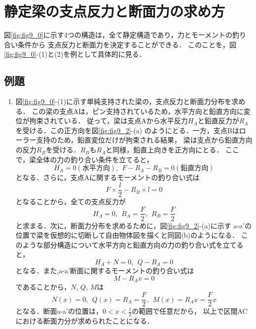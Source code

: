 \documentclass[10pt,a4j]{jbook}
\begin{document}
\section{静定梁の支点反力と断面力の求め方}
図\ref{fig:fig9_0}に示す4つの構造は，全て静定構造であり，力とモーメントの釣り合い条件から
支点反力と断面力を決定することができる．
このことを，図\ref{fig:fig9_0}-(1)と(2)を例として具体的に見る．
\subsection{例題}
\begin{enumerate}
\item
図\ref{fig:fig9_0}-(1)に示す単純支持された梁の，支点反力と断面力分布を求める．
この梁の支点Aは，ピン支持されているため，水平方向と鉛直方向に変位が拘束されている．
従って，梁は支点Aから水平反力$H_A$と鉛直反力が$R_A$を受ける．この正方向を図\ref{fig:fig9_2}-(a)
のようにとる．一方，支点Bはローラー支持のため，鉛直変位だけが拘束される結果，
梁は支点から鉛直方向の反力$R_B$を受ける．$R_B$も$R_A$と同様，鉛直上向きを正方向にとる．
ここで，梁全体の力の釣り合い条件を立てると，
\begin{equation}
	H_A=0(水平方向), \ \ 
	F-R_A-R_B=0(鉛直方向)
	\label{eqn:}
\end{equation}
となる．さらに，支点Aに関するモーメントの釣り合い式は
\begin{equation}
	F\times \frac{l}{2}-R_B\times l =0
	\label{eqn:}
\end{equation}
となることから，全ての支点反力が
\begin{equation}
	H_A=0, \ \ R_A=\frac{F}{2}, \ \ R_B=\frac{F}{2}
	\label{eqn:}
\end{equation}
と求まる．次に，断面力分布を求めるために，図\ref{fig:fig9_2}-(a)に示す
a-a'の位置で梁を仮想的に切断して自由物体図を描くと同図(b)のようになる．
このような部分構造について水平方向と鉛直方向の力の釣り合い式を立てると，
\begin{equation}
	H_A+N=0, \ \ Q-R_A=0
	\label{eqn:}
\end{equation}
となる．また,a-a'断面に関するモーメントの釣り合い式は
\begin{equation}
	M-R_A x=0
	\label{eqn:}
\end{equation}
であることから，$N,\, Q,\, M$は
\begin{equation}
	N(x)=0,\ \ Q(x)=R_A=\frac{F}{2}, \ \ 
	M(x)= R_Ax =\frac{F}{2}x
	\label{eqn:}
\end{equation}
となる．断面a-a'の位置は，$0< x< \frac{l}{2}$の範囲で任意だから，
以上で区間ACにおける断面力分が求められたことになる．

\end{enumerate}
\end{document}
